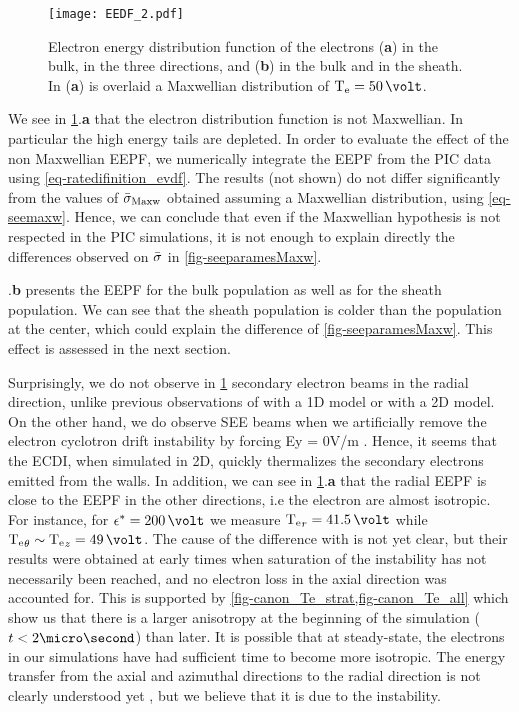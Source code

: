     \begin{figure}[hbtp]
       \centering
       \texttt{[image: EEDF\_2.pdf]}
       \caption{Electron energy distribution function of the electrons ({\bf a}) in the bulk, in the three directions, and ({\bf b}) in the bulk and in the sheath. In ({\bf a}) is overlaid a Maxwellian distribution of $\Te=50\,\volt$. }
       \label{fig-EEDF}
     \end{figure}
     
    We see in \cref{fig-EEDF}.{\bf a} that the electron distribution function is not Maxwellian.
    In particular the high energy tails are depleted.
    In order to evaluate the effect of the non Maxwellian EEPF, we numerically integrate the EEPF from the PIC data using \cref{eq-ratedifinition_evdf}.
    The results (not shown) do not differ significantly from the values of $ \bar{\sigma }_{\rm Maxw}$ obtained assuming a Maxwellian distribution, using \cref{eq-seemaxw}.
    Hence, we can conclude that even if the Maxwellian hypothesis is not respected in the PIC simulations, it is not enough to explain directly the differences observed on $ \bar{\sigma }$ in \cref{fig-seeparamesMaxw}.


    .{\bf b} presents the EEPF for the bulk population as well as for the sheath population.
    We can see that the sheath population is colder than the population at the center, which could explain the difference of \cref{fig-seeparamesMaxw}. 
    This effect is assessed in the next section.

     Surprisingly, we do not observe in \cref{fig-EEDF} secondary electron beams in the radial  direction, unlike previous observations of \citet{sydorenko2006} with a 1D model or \citet{heron2013} with a 2D model.
     On the other hand, we do observe SEE beams when  we artificially remove the electron cyclotron drift instability by forcing Ey = 0V/m \citep{croes2017}.
     Hence, it seems that the ECDI, when simulated in 2D, quickly thermalizes the secondary electrons emitted from the walls.
     In addition, we can see in \cref{fig-EEDF}.{\bf a} that the radial EEPF is close to the EEPF in the other directions, i.e the electron are almost isotropic.
     For instance, for $\crover = 200\,\volt$  we measure $\Te_r = 41.5\,\volt$ while $\Te_{\theta} \sim \Te_z = 49\,\volt$.
     The cause of the difference with \citet{heron2013} is not yet clear, but their results were  obtained at early times when saturation of the instability has not necessarily been reached, and no electron loss in  the axial direction was accounted for.
     This is supported by \cref{fig-canon_Te_strat,fig-canon_Te_all} which show us that there is a larger anisotropy at the beginning of the simulation ($t<2\micro\second$) than later.
     It is possible that at steady-state, the electrons in our simulations have had sufficient time to become more isotropic.
     The energy transfer from the axial and azimuthal directions to the radial direction is not clearly understood
     yet \citep{janhunen2018}, but we believe that it is due to the instability.



